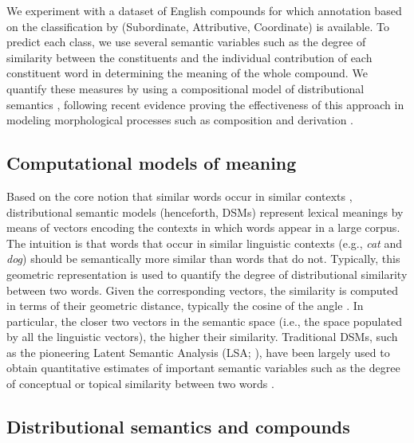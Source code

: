\documentclass[output=paper]{langsci/langscibook}
\begin{document}
We experiment with a dataset of English compounds for which annotation based on the classification by \cite{SB2005} (Subordinate, Attributive, Coordinate) is available. To predict each class, we use several semantic variables such as the degree of similarity between the constituents and the individual contribution of each constituent word in determining the meaning of the whole compound. We quantify these measures by using a compositional model of distributional semantics \citep{baroni2010,guevara2010,mitchell2010,zanzotto2010}, following recent evidence proving the effectiveness of this approach in modeling morphological processes such as composition and derivation \citep{marelli2015,gunther2016,marelli2017}.

\subsection{Computational models of meaning}

Based on the core notion that similar words occur in similar contexts \citep{harris1954,firth1957}, distributional semantic models (henceforth, DSMs) represent lexical meanings by means of vectors encoding the contexts in which words appear in a large corpus. The intuition is that words that occur in similar linguistic contexts (e.g., \emph{cat} and \emph{dog}) should be semantically more similar than words that do not. Typically, this geometric representation is used to quantify the degree of distributional similarity between two words. Given the corresponding vectors, the similarity is computed in terms of their geometric distance, typically the cosine of the angle \citep{turney2010}. In particular, the closer two vectors in the semantic space (i.e., the space populated by all the linguistic vectors), the higher their similarity. Traditional DSMs, such as the pioneering Latent Semantic Analysis (LSA; \citealt{landauer1997}), have been largely used to obtain quantitative estimates of important semantic variables such as the degree of conceptual or topical similarity between two words \citep{pado2007,gagnesp2009,kuperman2009,wang2014}.


\subsection{Distributional semantics and compounds}\label{sec:relnew}
\end{document}
